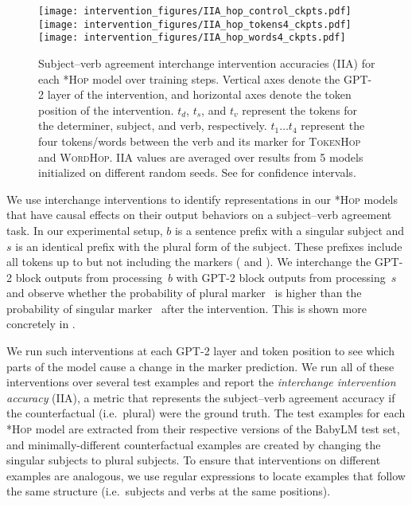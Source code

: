 \documentclass[11pt]{article}
\newcommand{\singularmarker}{%
  \setlength{\fboxsep}{1pt}%
  \fbox{\texttt{S}}%
}
\newcommand{\pluralmarker}{%
  \setlength{\fboxsep}{1pt}%
  \fbox{\texttt{P}}%
}
\begin{document}
\begin{figure*}[ht]
     \centering
     \texttt{[image: intervention\_figures/IIA\_hop\_control\_ckpts.pdf]}
     \texttt{[image: intervention\_figures/IIA\_hop\_tokens4\_ckpts.pdf]}
     \texttt{[image: intervention\_figures/IIA\_hop\_words4\_ckpts.pdf]}
    \caption{Subject--verb agreement interchange intervention accuracies (IIA) for each
    \textsc{*Hop} model over training steps. Vertical axes denote the GPT-2 layer of the intervention, and horizontal axes denote the token position of the intervention. $t_d$, $t_s$, and $t_v$ represent the tokens for the determiner, subject, and verb, respectively. $t_1 \dots t_4$ represent the four tokens/words between the verb and its marker for \textsc{TokenHop} and \textsc{WordHop}.
    IIA values are averaged over results from 5 models initialized on different random seeds. See  for confidence intervals.
    }
    \label{fig:iia_hop_models}
\end{figure*}

We use interchange interventions to identify representations in our \textsc{*Hop} models 
that have causal effects on their output behaviors on a subject--verb agreement task. In 
our experimental setup, $b$ is a sentence prefix with a singular subject and $s$ is
an identical prefix with the plural form of the subject. These prefixes include all
tokens up to but not including the markers (\singularmarker \space and \pluralmarker).
We interchange the GPT-2 block outputs from processing~$b$ with GPT-2 block outputs
from processing~$s$ and observe %
whether the probability of plural marker~\pluralmarker \space is higher than the probability
of singular marker~\singularmarker \space after the intervention. This is 
shown more concretely in . 

We run such interventions at each GPT-2 layer and token position to see which 
parts of the model cause a change in the marker prediction. We run all of these
interventions over several test examples and report the \emph{interchange intervention
accuracy} (IIA), a metric that represents the subject--verb agreement accuracy if the
counterfactual (i.e.\ plural) were the ground truth. The test examples for each \textsc{*Hop} model are extracted from their respective versions of the BabyLM test set, and minimally-different counterfactual examples are created by changing the singular subjects to plural subjects.
To ensure that interventions on different examples are analogous, we use regular expressions to locate examples that follow the same structure (i.e.\ subjects and verbs at the same positions).
\end{document}
